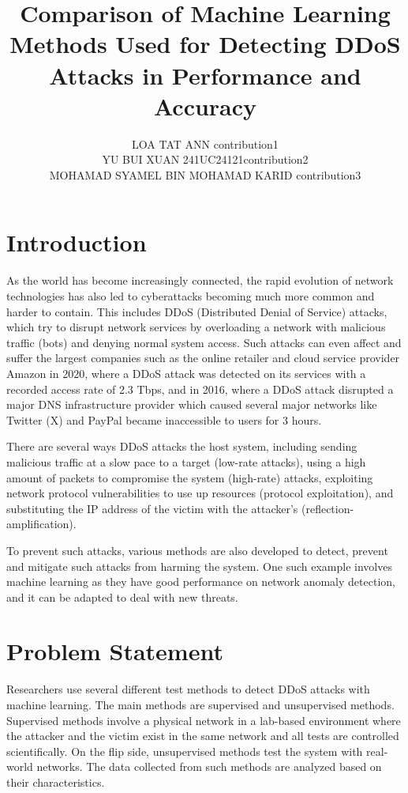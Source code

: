 \documentclass[a4paper, 12pt]{article}
\author{
LOA TAT ANN \quad 1221304731 \quad  contribution1 \\
YU BUI XUAN \quad 241UC24121\quad contribution2\\
MOHAMAD SYAMEL BIN MOHAMAD KARID \quad 1221309130 \quad contribution3\\
}
\title{Comparison of Machine Learning Methods Used for Detecting DDoS Attacks in Performance and Accuracy}
\begin{document}
\maketitle

\begin{abstract}

\end{abstract}


\section{Introduction}
As the world has become increasingly connected, the rapid evolution of network technologies has also led to cyberattacks becoming much more common and harder to contain. This includes DDoS (Distributed Denial of Service) attacks, which try to disrupt network services by overloading a network with malicious traffic (bots) and denying normal system access.  Such attacks can even affect and suffer the largest companies such as the online retailer and cloud service provider Amazon in 2020, where a DDoS attack was detected on its services with a recorded access rate of 2.3 Tbps, and in 2016, where a DDoS attack disrupted a major DNS infrastructure provider which caused several major networks like Twitter (X) and PayPal became inaccessible to users for 3 hours.  

There are several ways DDoS attacks the host system, including sending malicious traffic at a slow pace to a target (low-rate attacks), using a high amount of packets to compromise the system (high-rate) attacks, exploiting network protocol vulnerabilities to use up resources (protocol exploitation), and substituting the IP address of the victim with the attacker's (reflection-amplification).  

To prevent such attacks, various methods are also developed to detect, prevent and mitigate such attacks from harming the system. One such example involves machine learning as they have good performance on network anomaly detection, and it can be adapted to deal with new threats. 

\section{Problem Statement}
Researchers use several different test methods to detect DDoS attacks with machine learning. The main methods are supervised and unsupervised methods. Supervised methods involve a physical network in a lab-based environment where the attacker and the victim exist in the same network and all tests are controlled scientifically. On the flip side, unsupervised methods test the system with real-world networks. The data collected from such methods are analyzed based on their characteristics. 
\end{document}
